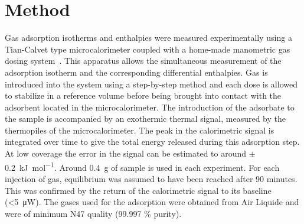 
\section{Method}

Gas adsorption isotherms and enthalpies were measured experimentally using a Tian-Calvet type 
microcalorimeter coupled with a home-made manometric gas dosing
system~\cite{LlewellynGasadsorptionmicrocalorimetry2005}. 
This apparatus allows the simultaneous measurement 
of the adsorption isotherm and the corresponding differential enthalpies. Gas is
introduced into the system using a step-by-step method and each dose is allowed to stabilize in a
reference volume before being brought into contact with the
adsorbent located in the microcalorimeter. The introduction of the adsorbate to the sample is 
accompanied by an exothermic thermal signal, measured by the
thermopiles of the microcalorimeter. The peak in the calorimetric signal is integrated over time 
to give the total energy released during this adsorption step.
At low coverage the error in the signal can be estimated to around \( \pm \) \SI{0.2}
{\kilo\joule\per\mol}. Around \SI{0.4}{\gram} of sample is used in each experiment. 
For each injection of gas, equilibrium was assumed to have
been reached after 90 minutes. This was confirmed by the return of the calorimetric signal to its
baseline (<\SI{5}{\micro\watt}). The gases used for the
adsorption were obtained from Air Liquide and were of minimum N47 quality (99.997 \% purity).